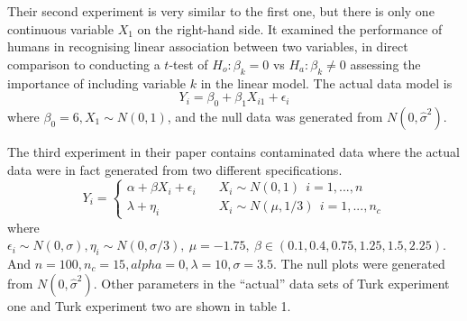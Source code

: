\documentclass[12pt]{article}
\begin{document}
Their second experiment is very similar to the first one, but there is
only one continuous variable \(X_1\) on the right-hand side. It examined
the performance of humans in recognising linear association between two
variables, in direct comparison to conducting a \(t\)-test of
\(H_o: \beta_k=0\) vs \(H_a: \beta_k\neq 0\) assessing the importance of
including variable \(k\) in the linear model. The actual data model is
\[Y_i=\beta_0+\beta_1 X_{i1}+\epsilon_i\] where
\(\beta_0=6, X_1\sim N(0,1)\), and the null data was generated from
\(N(0, \hat{\sigma}^2)\).

The third experiment in their paper contains contaminated data where the
actual data were in fact generated from two different specifications.
\[Y_i=
  \begin{cases}
    \alpha+\beta X_i+\epsilon_i       & \quad X_i\sim N(0,1)\ \ i=1,...,n\\
    \lambda+\eta_i  & \quad X_i\sim N(\mu,1/3)\ \ i=1,...,n_c
  \end{cases}
\] where
\(\epsilon_i \sim N(0,\sigma), \eta_i \sim N(0,\sigma/3), \ \mu=-1.75, \ \beta\in(0.1, 0.4, 0.75, 1.25, 1.5, 2.25)\).
And \(n=100, n_c=15, alpha=0, \lambda=10, \sigma=3.5\). The null plots
were generated from \(N(0,\hat{\sigma}^2)\). Other parameters in the
``actual'' data sets of Turk experiment one and Turk experiment two are
shown in table 1.
\end{document}
